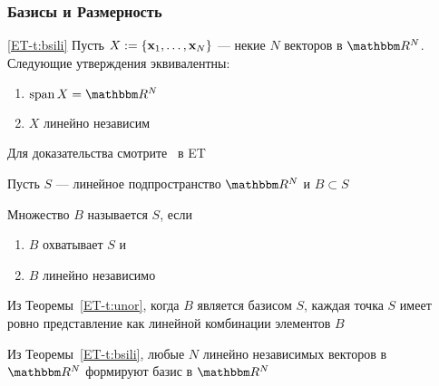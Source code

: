 \begin{frame}\frametitle{Базисы и Размерность}

    \vspace{2em}
    \Thm\eqref{ET-t:bsili}
        Пусть $X := \{ {\mathbf x}_1, \ldots, {\mathbf x}_N \}$ --- некие $N$ векторов в $\RR^N$.
        Следующие утверждения эквивалентны:
        \begin{enumerate}
            \item $\Span X = \RR^N$
            \item $X$ линейно независим
        \end{enumerate}
    
    \vspace{.7em}
    Для доказательства смотрите~\pageref{ET-t:bsili} в ET
    
\end{frame}

\begin{frame}

    \vspace{2em}
    Пусть $S$ --- линейное подпространство $\RR^N$ и $B \subset S$
    
    \vspace{.7em}
    Множество $B$ называется  $S$, если
    \begin{enumerate}
        \item $B$ охватывает $S$ и
        \item $B$ линейно независимо
    \end{enumerate}
    
    \vspace{.7em}
    
\end{frame}

\begin{frame}
    
    \vspace{2em}
    Из Теоремы~\ref{ET-t:unor}, когда
    $B$ является базисом $S$, каждая точка $S$ имеет ровно представление
    как линейной комбинации элементов $B$
    
    \vspace{.7em}
    Из Теоремы~\ref{ET-t:bsili}, любые $N$ линейно
    независимых векторов в $\RR^N$ формируют базис в $\RR^N$
    
\end{frame}

